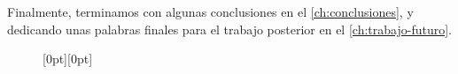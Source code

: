 Finalmente, terminamos con algunas conclusiones en el \cref{ch:conclusiones}, y dedicando unas palabras finales para el trabajo posterior en el \cref{ch:trabajo-futuro}.



\begin{landscape}
\begin{figure}[H]

\centering
%
\raisebox{-15.5cm}[0pt][0pt]{%
\resizebox{\linewidth}{!}{}
}

\end{figure}
\end{landscape}

\endinput
